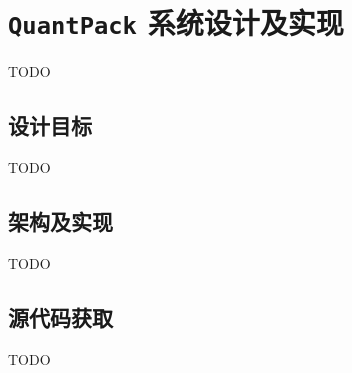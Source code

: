 \chapter{\texttt{QuantPack} 系统设计及实现}
TODO
\section{设计目标}
TODO
\section{架构及实现}
TODO
\section{源代码获取}
TODO
